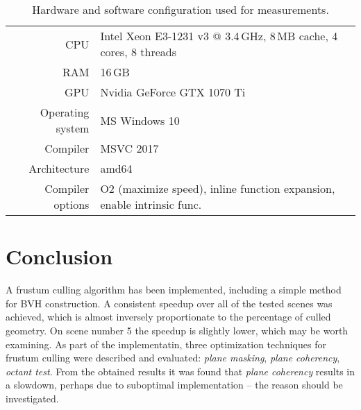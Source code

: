 \documentclass[report,11pt]{elsarticle}
\begin{document}
\begin{table*}[t]
\begin{center}
\begin{tabular}{| r || l |}
\hline
	CPU & Intel Xeon E3-1231 v3 @ 3.4\,GHz, 8\,MB cache, 4 cores, 8 threads \\
	RAM & 16\,GB \\
	GPU & Nvidia GeForce GTX 1070 Ti \\
\hline
\hline
	Operating system & MS Windows 10 \\
	Compiler & MSVC 2017\\
	Architecture & amd64 \\
	Compiler options & O2 (maximize speed), inline function expansion, enable intrinsic func. \\
\hline
\end{tabular}
\end{center}
	\caption{Hardware and software configuration used for measurements.}
	\label{TAB:configuration}
\end{table*}

\section{\label{SEC:Conclusion}Conclusion}
A frustum culling algorithm has been implemented, including a simple method for BVH construction. A consistent speedup over all of the tested scenes was achieved, which is almost inversely proportionate to the percentage of culled geometry. On scene number 5 the speedup is slightly lower, which may be worth examining. As part of the implementatin, three optimization techniques for frustum culling were described and evaluated: \emph{plane masking}, \emph{plane coherency}, \emph{octant test}. From the obtained results it was found that \emph{plane coherency} results in a slowdown, perhaps due to suboptimal implementation -- the reason should be investigated.

\end{document}
